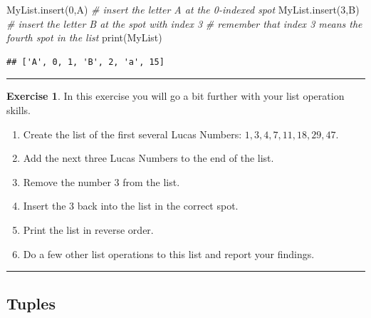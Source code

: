 \documentclass[
]{book}
\newenvironment{Shaded}{\begin{snugshade}}{\end{snugshade}}
\newcommand{\BuiltInTok}[1]{#1}
\newcommand{\CommentTok}[1]{\textcolor[rgb]{0.56,0.35,0.01}{\textit{#1}}}
\newcommand{\DecValTok}[1]{\textcolor[rgb]{0.00,0.00,0.81}{#1}}
\newcommand{\NormalTok}[1]{#1}
\newcommand{\StringTok}[1]{\textcolor[rgb]{0.31,0.60,0.02}{#1}}
\providecommand{\tightlist}{%
  \setlength{\itemsep}{0pt}\setlength{\parskip}{0pt}}
\theoremstyle{definition}
\theoremstyle{definition}
\theoremstyle{definition}
\newtheorem{exercise}{Exercise}[chapter]
\theoremstyle{remark}
\begin{document}
\begin{Shaded}
\begin{Highlighting}[]
\NormalTok{MyList.insert(}\DecValTok{0}\NormalTok{,}\StringTok{\textquotesingle{}A\textquotesingle{}}\NormalTok{) }\CommentTok{\# insert the letter \textasciigrave{}A\textasciigrave{} at the 0{-}indexed spot}
\NormalTok{MyList.insert(}\DecValTok{3}\NormalTok{,}\StringTok{\textquotesingle{}B\textquotesingle{}}\NormalTok{) }\CommentTok{\# insert the letter \textasciigrave{}B\textasciigrave{} at the spot with index 3 }
\CommentTok{\# remember that index 3 means the fourth spot in the list}
\BuiltInTok{print}\NormalTok{(MyList)}
\end{Highlighting}
\end{Shaded}

\begin{verbatim}
## ['A', 0, 1, 'B', 2, 'a', 15]
\end{verbatim}

\begin{center}\rule{0.5\linewidth}{0.5pt}\end{center}

\begin{exercise}
\protect\hypertarget{exr:unnamed-chunk-651}{}{\label{exr:unnamed-chunk-651} }In this exercise you will go a bit further with your list operation skills.

\begin{enumerate}
\def\labelenumi{\alph{enumi}.}
\tightlist
\item
  Create the list of the first several Lucas Numbers: \(1,3,4,7,11,18,29,47.\)
\item
  Add the next three Lucas Numbers to the end of the list.
\item
  Remove the number 3 from the list.
\item
  Insert the 3 back into the list in the correct spot.
\item
  Print the list in reverse order.
\item
  Do a few other list operations to this list and report your findings.
\end{enumerate}
\end{exercise}

\begin{center}\rule{0.5\linewidth}{0.5pt}\end{center}

\hypertarget{tuples}{%
\subsection{Tuples}\label{tuples}}
\end{document}
